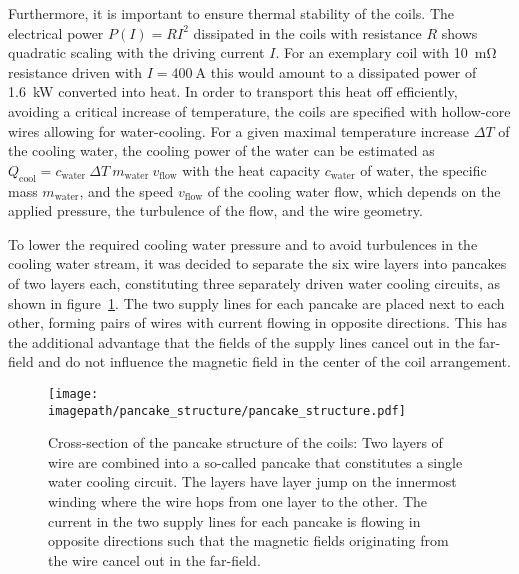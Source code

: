 Furthermore, it is important to ensure thermal stability of the coils. The electrical power $P(I) = RI^2$ dissipated in the coils with resistance $R$ shows quadratic scaling  with the driving current $I$. For an exemplary coil with \SI{10}{\milli\ohm} resistance driven with $I = \SI{400}{\ampere}$ this would amount to a dissipated power of \SI{1.6}{\kilo\watt} converted into heat. In order to transport this heat off efficiently, avoiding a critical increase of temperature, the coils are specified with hollow-core wires allowing for water-cooling. For a given maximal temperature increase $\Delta T$ of the cooling water, the cooling power of the water can be estimated as $Q_\text{cool} = c_\text{water} ~ \Delta T ~ m_\text{water} ~ v_\text{flow}$ with the heat capacity $ c_\text{water}$ of water, the specific mass $m_\text{water}$, and the speed $v_\text{flow}$ of the cooling water flow, which depends on the applied pressure, the turbulence of the flow, and the wire geometry.

To lower the required cooling water pressure and to avoid turbulences in the cooling water stream, it was decided to separate the six wire layers into pancakes of two layers each, constituting three separately driven water cooling circuits, as shown in figure~\ref{fig:pancake_structure}. The two supply lines for each pancake are placed next to each other, forming pairs of wires with current flowing in opposite directions. This has the additional advantage that the fields of the supply lines cancel out in the far-field and do not influence the magnetic field in the center of the coil arrangement.

\begin{figure}
    \centering
    \texttt{[image: \\imagepath/pancake\_structure/pancake\_structure.pdf]}
    \caption{Cross-section of the pancake structure of the coils: Two layers of wire are combined into a so-called pancake that constitutes a single water cooling circuit. The layers have layer jump on the innermost winding where the wire hops from one layer to the other. The current in the two supply lines for each pancake is flowing in opposite directions such that the magnetic fields originating from the wire cancel out in the far-field.}
    \label{fig:pancake_structure}
\end{figure}

